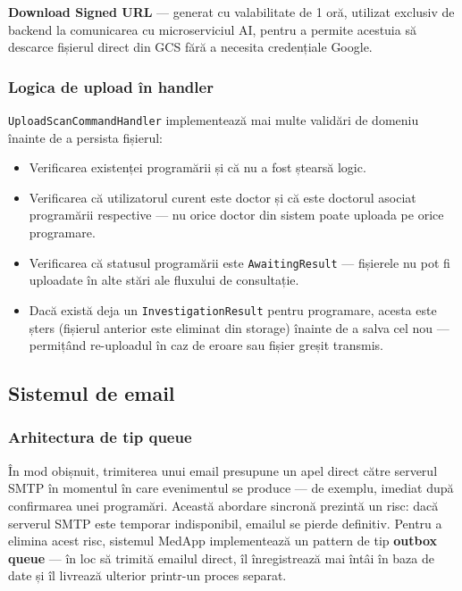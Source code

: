 \documentclass[12pt, a4paper]{report}
\begin{document}
\textbf{Download Signed URL} --- generat cu valabilitate de 1 oră, utilizat
exclusiv de backend la comunicarea cu microserviciul AI, pentru a permite
acestuia să descarce fișierul direct din GCS fără a necesita credențiale Google.

\subsubsection{Logica de upload în handler}

\texttt{UploadScanCommandHandler} implementează mai multe validări de domeniu
înainte de a persista fișierul:

\begin{itemize}
    \item Verificarea existenței programării și că nu a fost ștearsă logic.
    \item Verificarea că utilizatorul curent este doctor și că este doctorul
          asociat programării respective --- nu orice doctor din sistem poate
          uploada pe orice programare.
    \item Verificarea că statusul programării este \texttt{AwaitingResult} ---
          fișierele nu pot fi uploadate în alte stări ale fluxului de consultație.
    \item Dacă există deja un \texttt{InvestigationResult} pentru programare,
          acesta este șters (fișierul anterior este eliminat din storage) înainte
          de a salva cel nou --- permițând re-uploadul în caz de eroare sau
          fișier greșit transmis.
\end{itemize}


\subsection{Sistemul de email}

\subsubsection{Arhitectura de tip queue}

În mod obișnuit, trimiterea unui email presupune un apel direct către serverul SMTP
în momentul în care evenimentul se produce --- de exemplu, imediat după confirmarea
unei programări. Această abordare sincronă prezintă un risc: dacă serverul SMTP este
temporar indisponibil, emailul se pierde definitiv. Pentru a elimina acest risc,
sistemul MedApp implementează un pattern de tip \textbf{outbox queue} --- în loc să
trimită emailul direct, îl înregistrează mai întâi în baza de date și îl livrează
ulterior printr-un proces separat.
\end{document}
